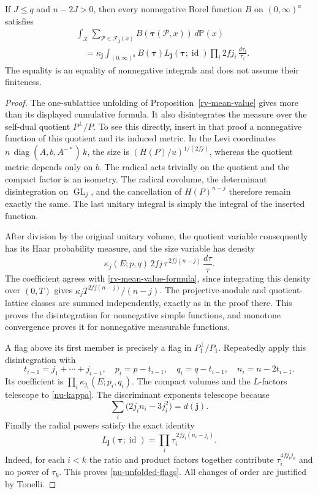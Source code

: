 \begin{proposition}\label{nu-flag-measure}
If $J\le q$ and $n-2J>0$, then every nonnegative
Borel function $B$ on $(0,\infty)^a$ satisfies
\begin{equation}\label{nu-unfolded-flags}
 \begin{split}
 &\int_{\mathcal X}
       \sum_{\mathcal P\in\mathcal F_{\mathbf j}(x)}
           B(\boldsymbol\tau(\mathcal P,x))\,d\mathbb P(x)\\
 &\quad=\kappa_{\mathbf j}
      \int_{(0,\infty)^a}
       B(\boldsymbol\tau)
       L_{\mathbf j}(\boldsymbol\tau;\operatorname{id})
                     \prod_i2fj_i\,\frac{d\tau_i}{\tau_i}.
 \end{split}
\end{equation}
The equality is an equality of nonnegative
integrals and does not assume their finiteness.
\end{proposition}
\begin{proof}
The one-sublattice unfolding
of Proposition~\ref{rv-mean-value} gives more
than its displayed cumulative formula.
It also disintegrates the measure over the
self-dual quotient $P^\perp/P$.
To see this directly, insert in that proof a
nonnegative function of this quotient and its
induced metric.  In the Levi coordinates
$n\,\operatorname{diag}(A,b,A^{-*})\,k$,
the size is $(H(P)/u)^{1/(2fj)}$, whereas the
quotient metric depends only on $b$.
The radical acts trivially on the quotient
and the compact factor is an isometry.
The radical covolume, the determinant
disintegration on $\operatorname{GL}_j$, and
the cancellation of $H(P)^{n-j}$ therefore
remain exactly the same.
The last unitary integral is simply the
integral of the inserted function.

After division by the original unitary volume,
the quotient variable consequently has its
Haar probability measure, and the size
variable has density
\[
       \kappa_j(E;p,q)\,
               2fj\,\tau^{\,2fj(n-j)}\,\frac{d\tau}{\tau}.
\]
The coefficient agrees with
\eqref{rv-mean-value-formula}, since integrating
this density over $(0,T)$ gives
$\kappa_jT^{2fj(n-j)}/(n-j)$.
The projective-module and quotient-lattice
classes are summed independently, exactly as
in the proof there.  This proves the
disintegration for nonnegative simple
functions, and monotone convergence proves
it for nonnegative measurable functions.

A flag above its first member is precisely
a flag in $P_1^\perp/P_1$.  Repeatedly apply
this disintegration with
\[
 t_{i-1}=j_1+\cdots+j_{i-1},\quad
 p_i=p-t_{i-1},\quad q_i=q-t_{i-1},\quad
 n_i=n-2t_{i-1}.
\]
Its coefficient is
$\prod_i\kappa_{j_i}(E;p_i,q_i)$.
The compact volumes and the $L$-factors
telescope to \eqref{nu-kappa}.  The
discriminant exponents telescope because
\[
 \sum_i\bigl(2j_in_i-3j_i^2\bigr)
                         =d(\mathbf j).
\]
Finally the radial powers satisfy the exact
identity
\[
 L_{\mathbf j}(\boldsymbol\tau;\operatorname{id})
          =\prod_i\tau_i^{\,2fj_i(n_i-j_i)}.
\]
Indeed, for each $i<k$ the ratio and product
factors together contribute
$\tau_i^{4fj_ij_k}$ and no power of $\tau_k$.
This proves \eqref{nu-unfolded-flags}.
All changes of order are justified by Tonelli.
\end{proof}

